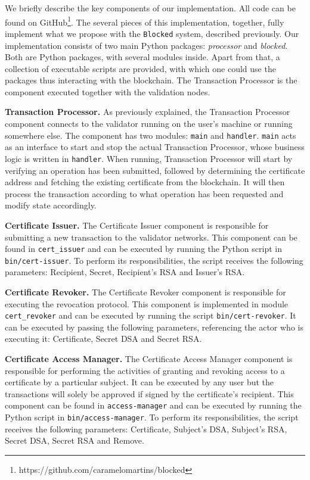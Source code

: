 We briefly describe the key components of our implementation. All code can be found on GitHub\footnote{https://github.com/caramelomartins/blocked}. The several pieces of this implementation, together, fully implement what we propose with the  \texttt{Blocked} system, described previously. Our implementation consists of two main Python packages: \textit{processor} and \textit{blocked}. Both are Python packages, with several modules inside. Apart from that, a collection of executable scripts are provided, with which one could use the packages thus interacting with the blockchain. The Transaction Processor is the component executed together with the validation nodes.

\textbf{Transaction Processor.} As previously explained, the Transaction Processor component connects to the validator running on the user's machine or running somewhere else. The component has two modules: \texttt{main} and \texttt{handler}. \texttt{main} acts as an interface to start and stop the actual Transaction Processor, whose business logic is written in \texttt{handler}. When running, Transaction Processor will start by verifying an operation has been submitted, followed by determining the certificate address and fetching the existing certificate from the blockchain. It will then process the transaction according to what operation has been requested and modify state accordingly.

\textbf{Certificate Issuer.} The Certificate Issuer component is responsible for submitting a new transaction to the validator networks. This component can be found in \texttt{cert\_issuer} and can be executed by running the Python script in \texttt{bin/cert-issuer}. To perform its responsibilities, the script receives the following parameters: Recipient, Secret, Recipient's RSA and Issuer's RSA.

\textbf{Certificate Revoker.} The Certificate Revoker component is responsible for executing the revocation protocol. This component is implemented in module \texttt{cert\_revoker} and can be executed by running the script \texttt{bin/cert-revoker}. It can be executed by passing the following parameters, referencing the actor who is executing it: Certificate, Secret DSA and Secret RSA.

\textbf{Certificate Access Manager.} The Certificate Access Manager component is responsible for performing the activities of granting and revoking access to a certificate by a particular subject. It can be executed by any user but the transactions will solely be approved if signed by the certificate's recipient. This component can be found in \texttt{access-manager} and can be executed by running the Python script in \texttt{bin/access-manager}. To perform its responsibilities, the script receives the following parameters: Certificate, Subject's DSA, Subject's RSA, Secret DSA, Secret RSA and Remove.

